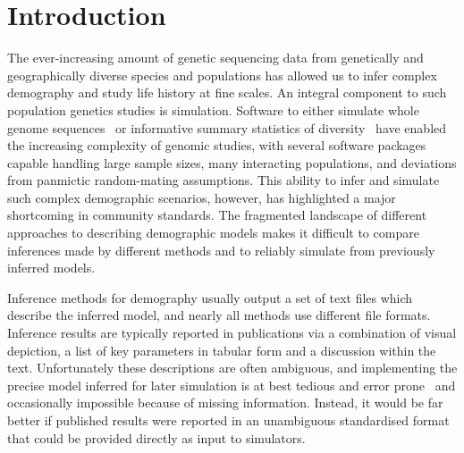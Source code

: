 \documentclass[11pt]{article}
\newcommand{\mhcomment}[1]{{\textcolor{cyan}{MH: #1}}}
\begin{document}
\section*{Introduction}

The ever-increasing amount of genetic sequencing data from genetically and
geographically diverse species and populations has allowed us to infer complex
demography and study life history at fine scales.
An integral component to such population genetics studies is simulation.
Software to either simulate whole genome
sequences~\citep{thornton2014cpp,thornton2019-nu,staab2015scrm,
baumdicker2021-iu,kelleher2016efficient,haller2019slim}
or informative summary statistics of
diversity~\citep{gutenkunst2009inferring,kamm2017efficient,jouganous2017inferring}
have enabled the increasing complexity of genomic studies, with several software
packages capable handling large sample sizes, many interacting populations, and
deviations from panmictic random-mating assumptions.
This ability to infer and simulate such complex demographic scenarios, however,
has highlighted a major shortcoming in community standards.
The fragmented landscape of different approaches to describing demographic
models makes it difficult to compare inferences made by different methods
and to reliably simulate from previously inferred models.

Inference methods for demography usually output a set of
text files which describe the inferred model,
and nearly all methods use different file formats.
Inference results are typically reported in publications
via a combination of visual depiction,
a list of key parameters in tabular form and a discussion within the text.
Unfortunately these descriptions are often ambiguous, and
implementing the precise model inferred for later simulation
is at best tedious and error prone~\citep{ragsdale2020lessons}
and occasionally impossible because of missing information. 
Instead, it would be far better if published results were reported
in an unambiguous standardised format that could be provided
directly as input to simulators.
\end{document}
